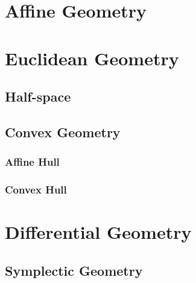 \section{Affine Geometry}\label{sec:affine_geometry}

\section{Euclidean Geometry}\label{sec:euclidean_geometry}

\subsection{Half-space}\label{sec:half_space}

\subsection{Convex Geometry}\label{sec:convex_geometry}

\subsubsection{Affine Hull}\label{sec:affine_hull}

\subsubsection{Convex Hull}\label{sec:convex_hull}



\section{Differential Geometry}\label{sec:differential_geometry}

\subsection{Symplectic Geometry}\label{sec:symplectic_geometry}
